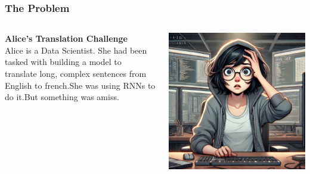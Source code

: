 \documentclass{beamer}
\begin{document}
\begin{frame}
    \frametitle{The Problem}
    \begin{columns}
        \begin{column}{0.6\textwidth}
            \begin{center}
                \huge \textbf{Alice’s Translation Challenge} \\
                \vspace{0.5cm}
                \large Alice is a Data Scientist. She had been tasked with building a model to  translate long, complex sentences from English to french.She was using RNNs to do it.But something was amiss. \\
               
            \end{center}
        \end{column}
        \begin{column}{0.4\textwidth}
            \begin{center}
                \includegraphics[width=\textwidth]{alice.png}
            \end{center}
        \end{column}
    \end{columns}
\end{frame}
\end{document}
